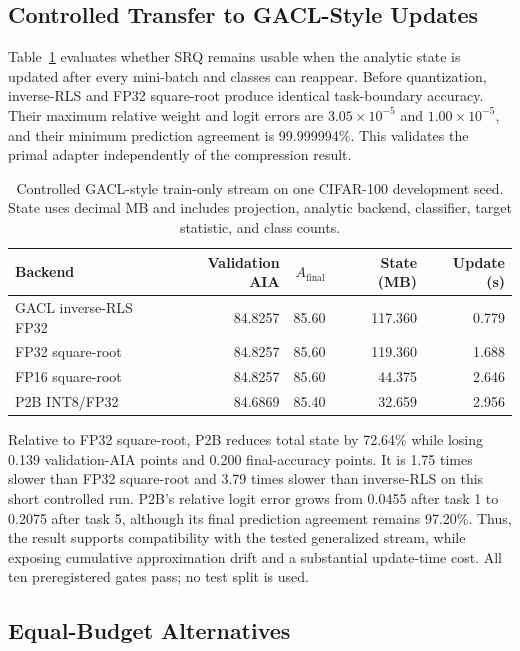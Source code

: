 \documentclass[runningheads]{llncs}
\begin{document}
\subsection{Controlled Transfer to GACL-Style Updates}

Table~\ref{tab:gacl-transfer} evaluates whether SRQ remains usable when the
analytic state is updated after every mini-batch and classes can reappear.
Before quantization, inverse-RLS and FP32 square-root produce identical
task-boundary accuracy. Their maximum relative weight and logit errors are
$3.05\times10^{-5}$ and $1.00\times10^{-5}$, and their minimum prediction
agreement is 99.999994\%. This validates the primal adapter independently of
the compression result.

\begin{table}
\caption{Controlled GACL-style train-only stream on one CIFAR-100 development
seed. State uses decimal MB and includes projection, analytic backend,
classifier, target statistic, and class counts.}
\label{tab:gacl-transfer}
\centering
\small
\begin{tabular}{lrrrr}
\toprule
Backend & Validation AIA & $A_{\mathrm{final}}$ & State (MB) & Update (s) \\
\midrule
GACL inverse-RLS FP32 & 84.8257 & 85.60 & 117.360 & 0.779 \\
FP32 square-root & 84.8257 & 85.60 & 119.360 & 1.688 \\
FP16 square-root & 84.8257 & 85.60 & 44.375 & 2.646 \\
P2B INT8/FP32 & 84.6869 & 85.40 & 32.659 & 2.956 \\
\bottomrule
\end{tabular}
\end{table}

Relative to FP32 square-root, P2B reduces total state by 72.64\% while losing
0.139 validation-AIA points and 0.200 final-accuracy points. It is 1.75 times
slower than FP32 square-root and 3.79 times slower than inverse-RLS on this
short controlled run. P2B's relative logit error grows from 0.0455 after task
1 to 0.2075 after task 5, although its final prediction agreement remains
97.20\%. Thus, the result supports compatibility with the tested generalized
stream, while exposing cumulative approximation drift and a substantial
update-time cost. All ten preregistered gates pass; no test split is used.

\subsection{Equal-Budget Alternatives}
\end{document}
